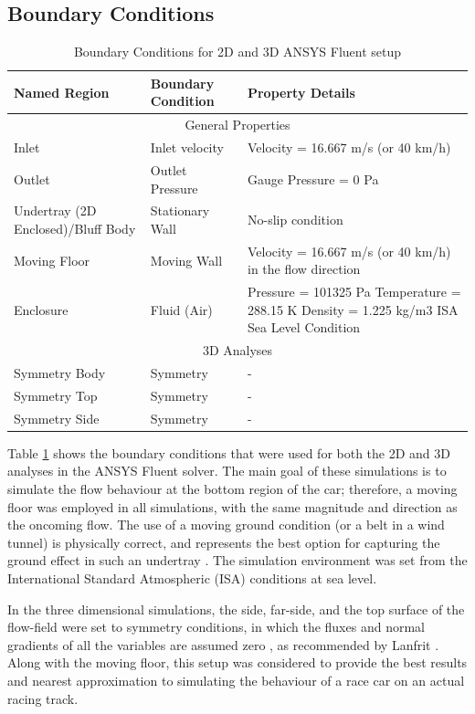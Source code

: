 \subsection{Boundary Conditions}
\begin{table}[!htb]
\centering
    \caption{Boundary Conditions for 2D and 3D ANSYS Fluent setup}
    \label{tab:Boundary Conditions}
\begin{tabular}{||p{3cm}|p{3cm}|p{6cm}||}
 \hline
 \centering
 Named Region  &  Boundary Condition  & Property Details\\
 \hline \hline
 \multicolumn{3}{||c||}{General Properties} \\
 \hline
 
 Inlet & Inlet velocity & Velocity = 16.667 m/s (or 40 km/h)\\
 \hline
 Outlet & Outlet Pressure  & Gauge Pressure = 0 Pa  \\
 \hline
 Undertray (2D Enclosed)/Bluff Body & Stationary Wall & No-slip condition\\
 \hline
 Moving Floor & Moving Wall & Velocity = 16.667 m/s (or 40 km/h) in the flow direction\\
 \hline
 Enclosure &   Fluid (Air)  & Pressure = 101325 Pa
Temperature = 288.15 K
Density = 1.225 kg/m3
ISA Sea Level Condition\\
 
 \hline
 \multicolumn{3}{||c||}{3D Analyses} \\
 \hline
 
 Symmetry Body & Symmetry  & -\\
 \hline
 Symmetry Top & Symmetry  & -\\
 \hline
 Symmetry Side & Symmetry & -\\
 \hline
 
\end{tabular}
\end{table}

\noindent Table \ref{tab:Boundary Conditions} shows the boundary conditions that were used for both the 2D and 3D analyses in the ANSYS Fluent solver. The main goal of these simulations is to simulate the flow behaviour at the bottom region of the car; therefore, a moving floor was employed in all simulations, with the same magnitude and direction as the oncoming flow. The use of a moving ground condition (or a belt in a wind tunnel) is physically correct, and represents the best option for capturing the ground effect in such an undertray \cite{Zhang2006GroundCars}\cite{Burgin1986WINDEFFECT}. The simulation environment was set from the International Standard Atmospheric (ISA) conditions at sea level. 

\noindent In the three dimensional simulations, the side, far-side, and the top surface of the flow-field were set to symmetry conditions, in which the fluxes and normal gradients of all the variables are assumed zero \cite{ANSYS2009SymmetryConditions}, as recommended by Lanfrit \cite{Lanfrit2005BestFLUENT}. Along with the moving floor, this setup was considered to provide the best results and nearest approximation to simulating the behaviour of a race car on an actual racing track.





